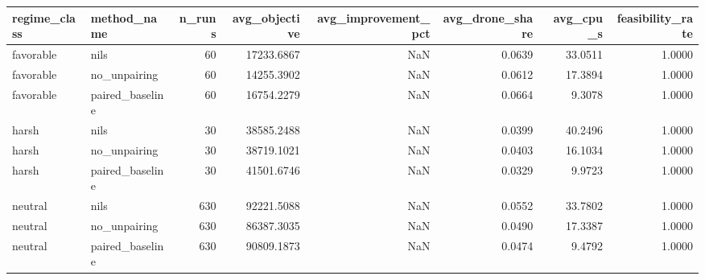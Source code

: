 \begin{tabular}{llrrrrrr}
\toprule
regime_class & method_name & n_runs & avg_objective & avg_improvement_pct & avg_drone_share & avg_cpu_s & feasibility_rate \\
\midrule
favorable & nils & 60 & 17233.6867 & NaN & 0.0639 & 33.0511 & 1.0000 \\
favorable & no_unpairing & 60 & 14255.3902 & NaN & 0.0612 & 17.3894 & 1.0000 \\
favorable & paired_baseline & 60 & 16754.2279 & NaN & 0.0664 & 9.3078 & 1.0000 \\
harsh & nils & 30 & 38585.2488 & NaN & 0.0399 & 40.2496 & 1.0000 \\
harsh & no_unpairing & 30 & 38719.1021 & NaN & 0.0403 & 16.1034 & 1.0000 \\
harsh & paired_baseline & 30 & 41501.6746 & NaN & 0.0329 & 9.9723 & 1.0000 \\
neutral & nils & 630 & 92221.5088 & NaN & 0.0552 & 33.7802 & 1.0000 \\
neutral & no_unpairing & 630 & 86387.3035 & NaN & 0.0490 & 17.3387 & 1.0000 \\
neutral & paired_baseline & 630 & 90809.1873 & NaN & 0.0474 & 9.4792 & 1.0000 \\
\bottomrule
\end{tabular}
